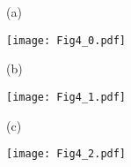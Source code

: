 \documentclass[12pt]{article}
\begin{document}
 

\begin{figure}
\begin{minipage}{8.5cm}
\begin{minipage}{0.5cm}
(a) \vspace{4.5cm}
\end{minipage}
\hfill
\begin{minipage}{8cm}
\texttt{[image: Fig4\_0.pdf]}
\end{minipage}
%
\vspace{0.8cm}
\vfill
%
\begin{minipage}{0.5cm}
(b)  \vspace{4.5cm} 
\end{minipage}
\hfill
%
\begin{minipage}{8cm} 
\texttt{[image: Fig4\_1.pdf]}
\end{minipage}
\end{minipage} %
%
\hfill
\hspace{0.15cm} 
\begin{minipage}{8.5cm} 
\begin{minipage}{0.5cm}
(c)  \vspace{10.6cm}
\end{minipage}
\hfill
%
\begin{minipage}{8cm} 
\texttt{[image: Fig4\_2.pdf]}
\end{minipage}
\end{minipage}
\end{figure}
\end{document}
